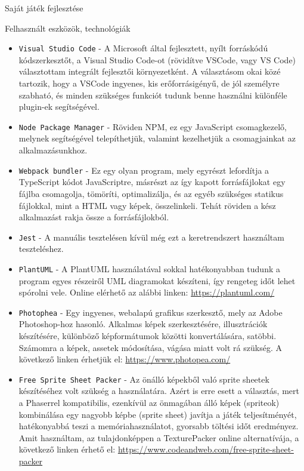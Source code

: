 \begin{MyChapter}{Saját játék fejlesztése}
\begin{MySection}{Felhasznált eszközök, technológiák}
\begin{itemize}
			\item \texttt{Visual Studio Code} - A Microsoft által fejlesztett, nyílt forráskódú kódszerkesztőt, a Visual Studio Code-ot (rövidítve VSCode, vagy VS Code) választottam integrált fejlesztői környezetként. A választásom okai közé tartozik, hogy a VSCode ingyenes, kis erőforrásigényű, de jól személyre szabható, és minden szükséges funkciót tudunk benne használni különféle plugin-ek segítségével.
			
			\item \texttt{Node Package Manager} - Röviden NPM, ez egy JavaScript csomagkezelő, melynek segítségével telepíthetjük, valamint kezelhetjük a csomagjainkat az alkalmazásunkhoz.
			
			\item \texttt{Webpack bundler} - Ez egy olyan program, mely egyrészt lefordítja a TypeScript kódot JavaScriptre, másrészt az így kapott forrásfájlokat egy fájlba csomagolja, tömöríti, optimalizálja, és az egyéb szükséges statikus fájlokkal, mint a HTML vagy képek, összelinkeli. Tehát röviden a kész alkalmazást rakja össze a forrásfájlokból.
			
			\item \texttt{Jest} - A manuális tesztelésen kívül még ezt a keretrendszert használtam teszteléshez.
			
			\item \texttt{PlantUML} - A PlantUML használatával sokkal hatékonyabban tudunk a program egyes részeiről UML diagramokat készíteni, így rengeteg időt lehet spórolni vele. Online elérhető az alábbi linken: \url{https://plantuml.com/}
			                                                                                 
			\item \texttt{Photophea} - Egy ingyenes, webalapú grafikus szerkesztő, mely az Adobe Photo\-shop-hoz hasonló. Alkalmas képek szerkesztésére, illusztrációk készítésére, különböző képformátumok közötti konvertálására, satöbbi.
			Számomra a képek, assetek módosítása, vágása miatt volt rá szükség.
			A következő linken érhetjük el: \url{https://www.photopea.com/}
			
			\item \texttt{Free Sprite Sheet Packer} - Az önálló képekből való sprite sheetek készítéséhez volt szükség a használatára. Azért is erre esett a választás, mert a Phaserrel kompatibilis, ezenkívül az önmagában álló képek (spriteok) kombinálása egy nagyobb képbe (sprite sheet) javítja a játék teljesítményét, hatékonyabbá teszi a memóriahasználatot, gyorsabb töltési időt eredményez.
			\cite{spritesheet}
			Amit használtam, az tulajdonképpen a TexturePacker online alternatívája, a következő linken érhető el: \url{https://www.codeandweb.com/free-sprite-sheet-packer}
			

\end{itemize}
\end{MySection}
\end{MyChapter}
